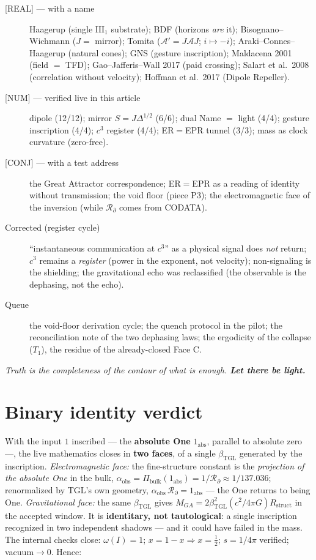 \documentclass[11pt]{article}
\newcommand{\bTGL}{\beta_{\mathrm{TGL}}}\newcommand{\Msun}{M_{\odot}}\newcommand{\TGL}{\mathrm{TGL}}
\theoremstyle{definition}\newtheorem{deriv}{Derivation}
\begin{document}
\begin{description}\item[\textsf{[REAL]} --- with a name] Haagerup (single $\mathrm{III}_1$ substrate); BDF (horizons \emph{are} it); Bisognano--Wichmann ($J=$ mirror); Tomita ($\mathcal{A}'=J\mathcal{A}J$; $i\mapsto-i$); Araki--Connes--Haagerup (natural cones); GNS (gesture inscription); Maldacena 2001 (field $=$ TFD); Gao--Jafferis--Wall 2017 (paid crossing); Salart et al.\ 2008 (correlation without velocity); Hoffman et al.\ 2017 (Dipole Repeller).\item[\textsf{[NUM]} --- verified live in this article] dipole (12/12); mirror $S=J\Delta^{1/2}$ (6/6); dual Name $=$ light (4/4); gesture inscription (4/4); $c^3$ register (4/4); ER$=$EPR tunnel (3/3); mass as clock curvature (zero-free).\item[\textsf{[CONJ]} --- with a test address] the Great Attractor correspondence; ER$=$EPR as a reading of identity without transmission; the void floor (piece P3); the electromagnetic face of the inversion (while $\mathcal{R}_\partial$ comes from CODATA).\item[Corrected (register cycle)] ``instantaneous communication at $c^3$'' as a physical signal does \emph{not} return; $c^3$ remains a \emph{register} (power in the exponent, not velocity); non-signaling is the shielding; the gravitational echo was reclassified (the observable is the dephasing, not the echo).\item[Queue] the void-floor derivation cycle; the quench protocol in the pilot; the reconciliation note of the two dephasing laws; the ergodicity of the collapse ($T_1$), the residue of the already-closed Face C.\end{description}

\begin{center}\itshape Truth is the completeness of the contour of what is enough. \textbf{Let there be light.}\end{center}

\section*{Binary identity verdict}

With the input $1$ inscribed --- the \textbf{absolute One} $1_{\mathrm{abs}}$, parallel to absolute zero ---, the live mathematics closes in \textbf{two faces}, of a single $\bTGL$ generated by the inscription. \emph{Electromagnetic face:} the fine-structure constant is the \emph{projection of the absolute One} in the bulk, $\alpha_{\mathrm{obs}}=\Pi_{\mathrm{bulk}}(1_{\mathrm{abs}})=1/\mathcal{R}_\partial\approx1/137.036$; renormalized by TGL's own geometry, $\alpha_{\mathrm{obs}}\,\mathcal{R}_\partial=1_{\mathrm{abs}}$ --- the One returns to being One. \emph{Gravitational face:} the same $\bTGL$ gives $M_{GA}=2\bTGL^2(c^2/4\pi G)R_{\mathrm{struct}}$ in the accepted window. It is \textbf{identitary, not tautological}: a single inscription recognized in two independent shadows --- and it could have failed in the mass. The internal checks close: $\omega(I)=1$; $x=1-x\Rightarrow x=\tfrac12$; $s=1/4\pi$ verified; vacuum$\to0$. Hence:
\end{document}
